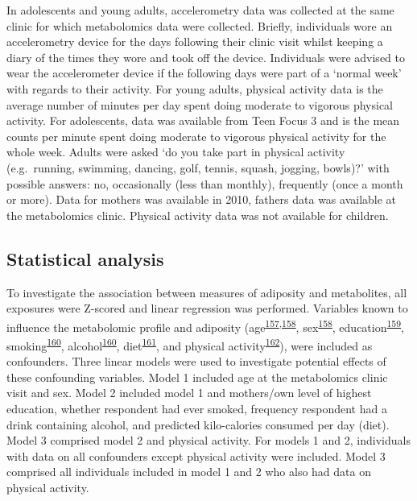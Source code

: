 \documentclass[11pt,twoside]{bristolthesis}
\begin{document}
In adolescents and young adults, accelerometry data was collected at the same clinic for which metabolomics data were collected. Briefly, individuals wore an accelerometry device for the days following their clinic visit whilst keeping a diary of the times they wore and took off the device. Individuals were advised to wear the accelerometer device if the following days were part of a `normal week' with regards to their activity. For young adults, physical activity data is the average number of minutes per day spent doing moderate to vigorous physical activity. For adolescents, data was available from Teen Focus 3 and is the mean counts per minute spent doing moderate to vigorous physical activity for the whole week. Adults were asked `do you take part in physical activity (e.g.~running, swimming, dancing, golf, tennis, squash, jogging, bowls)?' with possible answers: no, occasionally (less than monthly), frequently (once a month or more). Data for mothers was available in 2010, fathers data was available at the metabolomics clinic. Physical activity data was not available for children.

\hypertarget{statistical-analysis}{%
\subsection{Statistical analysis}\label{statistical-analysis}}

To investigate the association between measures of adiposity and metabolites, all exposures were Z-scored and linear regression was performed. Variables known to influence the metabolomic profile and adiposity (age\textsuperscript{\protect\hyperlink{ref-Yu2012}{157},\protect\hyperlink{ref-Brennan2020}{158}}, sex\textsuperscript{\protect\hyperlink{ref-Brennan2020}{158}}, education\textsuperscript{\protect\hyperlink{ref-Zajacova2018}{159}}, smoking\textsuperscript{\protect\hyperlink{ref-Bonevski2014}{160}}, alcohol\textsuperscript{\protect\hyperlink{ref-Bonevski2014}{160}}, diet\textsuperscript{\protect\hyperlink{ref-Afshin2019}{161}}, and physical activity\textsuperscript{\protect\hyperlink{ref-ODonoghue2018}{162}}), were included as confounders. Three linear models were used to investigate potential effects of these confounding variables. Model 1 included age at the metabolomics clinic visit and sex. Model 2 included model 1 and mothers/own level of highest education, whether respondent had ever smoked, frequency respondent had a drink containing alcohol, and predicted kilo-calories consumed per day (diet). Model 3 comprised model 2 and physical activity. For models 1 and 2, individuals with data on all confounders except physical activity were included. Model 3 comprised all individuals included in model 1 and 2 who also had data on physical activity.
\end{document}
